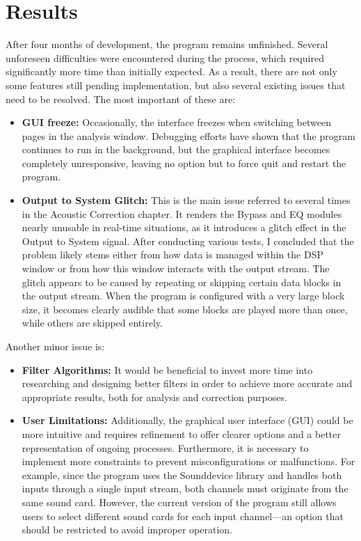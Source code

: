 \chapter{Results}

After four months of development, the program remains unfinished. Several unforeseen difficulties were encountered during the process, which required significantly more time than initially expected. As a result, there are not only some features still pending implementation, but also several existing issues that need to be resolved. The most important of these are:

\begin{itemize}
	\item \textbf{GUI freeze:} Occasionally, the interface freezes when switching between pages in the analysis window. Debugging efforts have shown that the program continues to run in the background, but the graphical interface becomes completely unresponsive, leaving no option but to force quit and restart the program.
	
	\item \textbf{Output to System Glitch:} This is the main issue referred to several times in the Acoustic Correction chapter. It renders the Bypass and EQ modules nearly unusable in real-time situations, as it introduces a glitch effect in the Output to System signal. After conducting various tests, I concluded that the problem likely stems either from how data is managed within the DSP window or from how this window interacts with the output stream. The glitch appears to be caused by repeating or skipping certain data blocks in the output stream. When the program is configured with a very large block size, it becomes clearly audible that some blocks are played more than once, while others are skipped entirely.
\end{itemize}

Another minor issue is:

\begin{itemize}
		
	\item \textbf{Filter Algorithms:} It would be beneficial to invest more time into researching and designing better filters in order to achieve more accurate and appropriate results, both for analysis and correction purposes.
	
	\item \textbf{User Limitations:} Additionally, the graphical user interface (GUI) could be more intuitive and requires refinement to offer clearer options and a better representation of ongoing processes. Furthermore, it is necessary to implement more constraints to prevent misconfigurations or malfunctions. For example, since the program uses the Sounddevice library and handles both inputs through a single input stream, both channels must originate from the same sound card. However, the current version of the program still allows users to select different sound cards for each input channel—an option that should be restricted to avoid improper operation.
	
\end{itemize}


